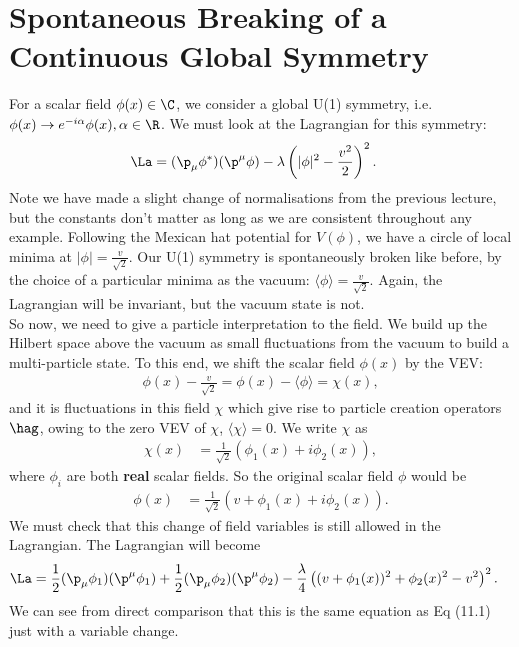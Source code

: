 \documentclass[a4paper, 11pt, normalem]{report}
\begin{document}
\section{Spontaneous Breaking of a Continuous Global Symmetry}
For a scalar field $\phi(x)\in\C$, we consider a global U(1) symmetry, i.e. $\phi(x)\to e^{-i\alpha}\phi(x),\alpha\in\R$.
We must look at the Lagrangian for this symmetry:
\begin{align}
    \La &= (\p_\mu\phi^*)(\p^\mu\phi) - \lambda\left(|\phi|^2-\frac{v^2}{2}\right)^2.
\end{align}
Note we have made a slight change of normalisations from the previous lecture, but the constants don't matter as long as we are consistent throughout any example.
Following the Mexican hat potential for $V(\phi)$, we have a circle of local minima at $|\phi|=\frac{v}{\sqrt{2}}$.
Our U(1) symmetry is spontaneously broken like before, by the choice of a particular minima as the vacuum: $\langle\phi\rangle = \frac{v}{\sqrt{2}}$.
Again, the Lagrangian will be invariant, but the vacuum state is not.\\
So now, we need to give a particle interpretation to the field.
We build up the Hilbert space above the vacuum as small fluctuations from the vacuum to build a multi-particle state.
To this end, we shift the scalar field $\phi(x)$ by the VEV:
\begin{align}
    \phi(x) - \frac{v}{\sqrt{2}} = \phi(x) - \langle\phi\rangle = \chi(x),
\end{align}
and it is fluctuations in this field $\chi$ which give rise to particle creation operators $\hag$, owing to the zero VEV of $\chi$, $\langle\chi\rangle=0$.
We write $\chi$ as
\begin{align}
    \chi(x) &= \frac{1}{\sqrt{2}}\left(\phi_1(x) + i\phi_2(x)\right),
\end{align}
where $\phi_i$ are both \textbf{real} scalar fields.
So the original scalar field $\phi$ would be
\begin{align}
    \phi(x) &= \frac{1}{\sqrt{2}}\left(v+\phi_1(x)+i\phi_2(x)\right).
\end{align}
We must check that this change of field variables is still allowed in the Lagrangian.
The Lagrangian will become
\begin{align}
    \La &= \frac12(\p_\mu\phi_1)(\p^\mu\phi_1) + \frac12(\p_\mu\phi_2)(\p^\mu\phi_2) - \frac{\lambda}{4}\left((v+\phi_1(x))^2+\phi_2(x)^2 - v^2\right)^2.
\end{align}
We can see from direct comparison that this is the same equation as Eq (11.1) just with a variable change.
\end{document}

